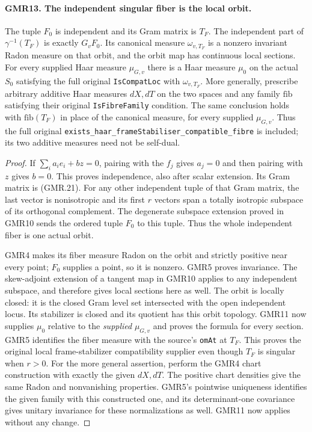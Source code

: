 \paragraph{GMR13. The independent singular fiber is the local orbit.}
\label{claim:GMR13}
The tuple $F_0$ is independent and its Gram matrix is $T_F$.
The independent part of $\gamma^{-1}(T_F)$ is exactly $G_vF_0$.
Its canonical measure $\omega_{v,T_F}$ is a nonzero invariant Radon
measure on that orbit, and the orbit map has continuous local
sections.  For every supplied Haar measure $\mu_{G,v}$ there is a
Haar measure $\mu_0$ on the actual $S_0$ satisfying the full original
\texttt{IsCompatLoc} with $\omega_{v,T_F}$.
More generally, prescribe arbitrary additive Haar measures $dX,dT$
on the two spaces and any family $\mathrm{fib}$ satisfying their
original \texttt{IsFibreFamily} condition.  The same conclusion holds
with $\mathrm{fib}(T_F)$ in place of the canonical measure, for every
supplied $\mu_{G,v}$.  Thus the full original
\texttt{exists\_haar\_frameStabiliser\_compatible\_fibre} is included;
its two additive measures need not be self-dual.

\begin{proof}
If $\sum_i a_i e_i+bz=0$, pairing with the $f_j$ gives $a_j=0$ and
then pairing with $z$ gives $b=0$.  This proves independence, also
after scalar extension.  Its Gram matrix is (GMR.21).
For any other independent tuple of that Gram matrix, the last
vector is nonisotropic and its first $r$ vectors span a totally
isotropic subspace of its orthogonal complement.  The degenerate
subspace extension proved in GMR10 sends the ordered tuple $F_0$
to this tuple.  Thus the whole independent fiber is one actual orbit.

GMR4 makes its fiber measure Radon on the orbit and strictly positive
near every point; $F_0$ supplies a point, so it is nonzero.
GMR5 proves invariance.  The skew-adjoint extension of a tangent
map in GMR10 applies to any independent subspace, and therefore
gives local sections here as well.  The orbit is locally closed:
it is the closed Gram level set intersected with the open
independent locus.  Its stabilizer is closed and its quotient has
this orbit topology.  GMR11 now supplies $\mu_0$ relative to the
\emph{supplied} $\mu_{G,v}$ and proves the formula for every section.
GMR5 identifies the fiber measure with the source's
\texttt{omAt} at $T_F$.  This proves the original local
frame-stabilizer compatibility supplier even though $T_F$ is singular
when $r>0$.
For the more general assertion, perform the GMR4 chart construction
with exactly the given $dX,dT$.  The positive chart densities give
the same Radon and nonvanishing properties.  GMR5's pointwise
uniqueness identifies the given family with this constructed one,
and its determinant-one covariance gives unitary invariance for
these normalizations as well.  GMR11 now applies without any change.
\end{proof}

